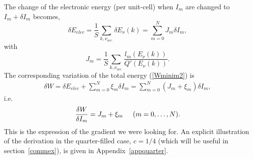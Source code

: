 \documentclass[]{revtex4-1}
\begin{document}
The change of the electronic energy (per unit-cell) when $I_m$ are changed to $I_m+\delta I_m$ becomes,
\begin{equation}
\delta E_{elec} = \frac{1}{S} \sum_{k, \nu_{occ.}} \delta E_{\nu}(k) =   \sum_{m=0}^N J_m \delta I_m, \label{gradientgeneral}
\end{equation}
with
\begin{equation}
J_m= \frac{1}{S} \sum_{k, \nu_{occ.}} \frac{l_m(E_{\nu}(k))}{Q'(E_{\nu}(k))}. \label{Jmsumk} 
\end{equation}
The corresponding variation of the total energy (\ref{Wminim2}) is
\begin{eqnarray}
  \delta W = \delta E_{elec}+ \sum_{m=0}^N \xi_m \delta I_m  = \sum_{m=0}^N (J_m+\xi_m) \delta I_m, \label{geneq0}
\end{eqnarray}
i.e.
\begin{eqnarray}
  \frac{\delta W}{\delta I_m} =  J_m+\xi_m \hspace{.5cm} (m=0,\dots,N).
\end{eqnarray}
This is the expression of the gradient we were looking for. An explicit illustration of the derivation in the quarter-filled case, $c=1/4$ (which will be useful in section~\ref{commex}), is given in Appendix~\ref{appquarter}.
\end{document}
